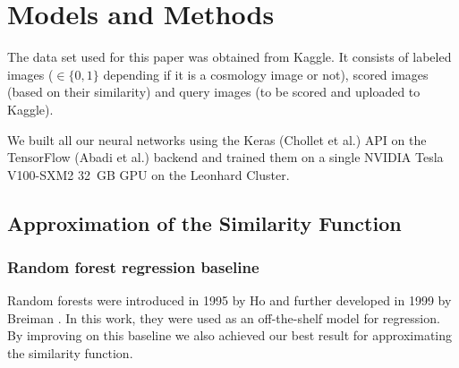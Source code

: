 \documentclass[10pt,conference,compsocconf]{IEEEtran}
\begin{document}


\section{Models and Methods} \label{sec:models_methods}
The data set used for this paper was obtained from Kaggle. It consists of labeled images ($\in \{0,1\}$ depending if it is a cosmology image or not), scored images (based on their similarity) and query images (to be scored and uploaded to Kaggle).

We built all our neural networks using the Keras (Chollet et al.\@ \cite{chollet2015keras}) API on the TensorFlow (Abadi et al.\@ \cite{tensorflow2015-whitepaper}) backend and trained them on a single NVIDIA Tesla V100-SXM2 \SI{32}{GB} GPU on the Leonhard Cluster.

\subsection{Approximation of the Similarity Function}

\subsubsection{Random forest regression baseline} 
Random forests were introduced in 1995 by Ho \cite{Ho} and further developed in 1999 by Breiman \cite{Breiman}. In this work, they were used as an off-the-shelf model for regression. By improving on this baseline we also achieved our best result for approximating the similarity function. 
\end{document}
